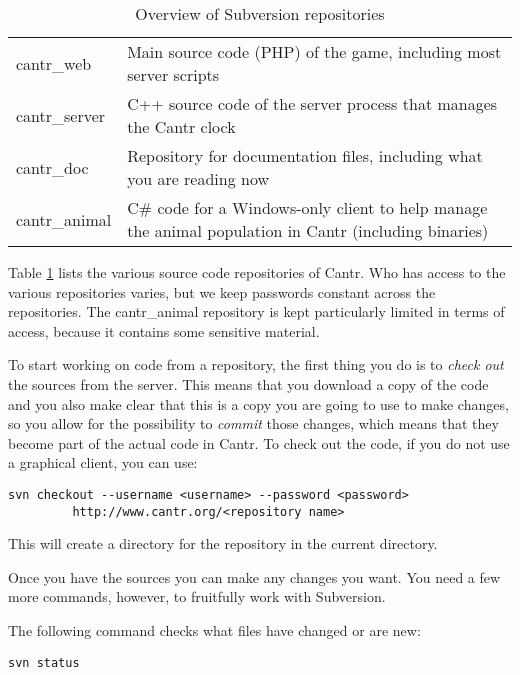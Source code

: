 \documentclass[a4paper,12pt]{article}
\begin{document}
\begin{table}[!ht]
\colorbox{gray!20}{
\begin{minipage}{.8\textwidth}
\begin{center}

\begin{tabular}{lp{}}
cantr\_web & Main source code (PHP) of the game, including most server scripts \\
cantr\_server & C++ source code of the server process that manages the Cantr clock \\
cantr\_doc & Repository for documentation files, including what you are reading now \\
cantr\_animal & C\# code for a Windows-only client to help manage the animal population in Cantr (including binaries) \\
\end{tabular}
\caption{Overview of Subversion repositories}
\label{svnreps}
\end{center}
\end{minipage}}
\end{table}
Table \ref{svnreps} lists the various source code repositories of Cantr. Who has access to the various repositories varies, but we keep passwords constant across the repositories. The cantr\_animal repository is kept particularly limited in terms of access, because it contains some sensitive material.

To start working on code from a repository, the first thing you do is to {\it check out} the sources from the server. This means that you download a copy of the code and you also make clear that this is a copy you are going to use to make changes, so you allow for the possibility to {\it commit} those changes, which means that they become part of the actual code in Cantr. To check out the code, if you do not use a graphical client, you can use:
\begin{verbatim}
svn checkout --username <username> --password <password>
         http://www.cantr.org/<repository name>
\end{verbatim}
This will create a directory for the repository in the current directory. 

Once you have the sources you can make any changes you want. You need a few more commands, however, to fruitfully work with Subversion.

The following command checks what files have changed or are new:
\begin{verbatim}
svn status
\end{verbatim}
\end{document}
